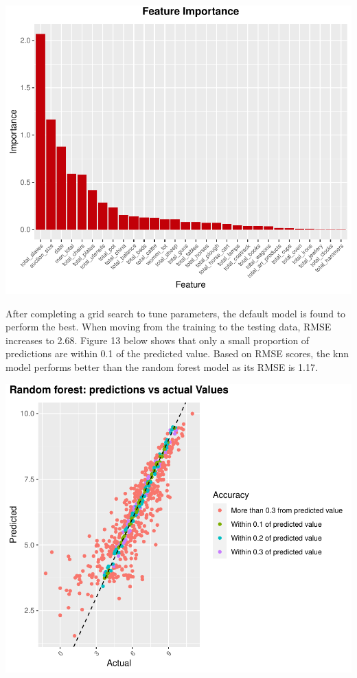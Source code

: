 \documentclass[11pt,preprint, authoryear]{elsarticle}
\numberwithin{equation}{section}
\numberwithin{figure}{section}
\numberwithin{table}{section}
\begin{document}
\begin{center}\includegraphics{Project_write_up_files/figure-latex/Figure12, -1} \end{center}

After completing a grid search to tune parameters, the default model is
found to perform the best. When moving from the training to the testing
data, RMSE increases to 2.68. Figure 13 below shows that only a small
proportion of predictions are within 0.1 of the predicted value. Based
on RMSE scores, the knn model performs better than the random forest
model as its RMSE is 1.17.

\begin{center}\includegraphics{Project_write_up_files/figure-latex/Figure13-1} \end{center}
\end{document}
